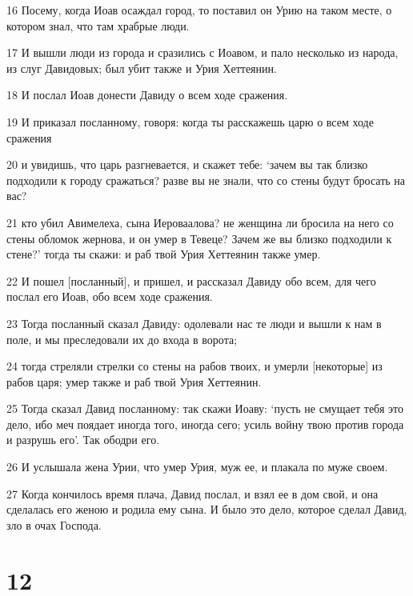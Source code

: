 \par 16 Посему, когда Иоав осаждал город, то поставил он Урию на таком месте, о котором знал, что там храбрые люди.
\par 17 И вышли люди из города и сразились с Иоавом, и пало несколько из народа, из слуг Давидовых; был убит также и Урия Хеттеянин.
\par 18 И послал Иоав донести Давиду о всем ходе сражения.
\par 19 И приказал посланному, говоря: когда ты расскажешь царю о всем ходе сражения
\par 20 и увидишь, что царь разгневается, и скажет тебе: `зачем вы так близко подходили к городу сражаться? разве вы не знали, что со стены будут бросать на вас?
\par 21 кто убил Авимелеха, сына Иероваалова? не женщина ли бросила на него со стены обломок жернова, и он умер в Тевеце? Зачем же вы близко подходили к стене?' тогда ты скажи: и раб твой Урия Хеттеянин также умер.
\par 22 И пошел [посланный], и пришел, и рассказал Давиду обо всем, для чего послал его Иоав, обо всем ходе сражения.
\par 23 Тогда посланный сказал Давиду: одолевали нас те люди и вышли к нам в поле, и мы преследовали их до входа в ворота;
\par 24 тогда стреляли стрелки со стены на рабов твоих, и умерли [некоторые] из рабов царя; умер также и раб твой Урия Хеттеянин.
\par 25 Тогда сказал Давид посланному: так скажи Иоаву: `пусть не смущает тебя это дело, ибо меч поядает иногда того, иногда сего; усиль войну твою против города и разрушь его'. Так ободри его.
\par 26 И услышала жена Урии, что умер Урия, муж ее, и плакала по муже своем.
\par 27 Когда кончилось время плача, Давид послал, и взял ее в дом свой, и она сделалась его женою и родила ему сына. И было это дело, которое сделал Давид, зло в очах Господа.

\chapter{12}

